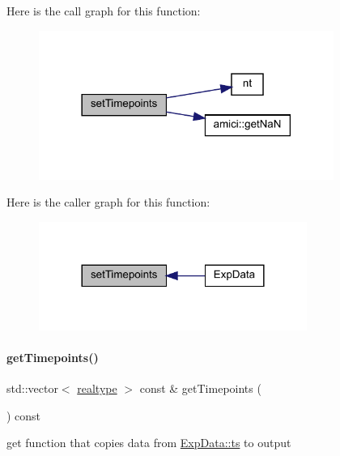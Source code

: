 Here is the call graph for this function\+:
\nopagebreak
\begin{figure}[H]
\begin{center}
\leavevmode
\includegraphics[width=273pt]{classamici_1_1_exp_data_a058fb6c96339b5116b1af937bc77c2e4_cgraph}
\end{center}
\end{figure}
Here is the caller graph for this function\+:
\nopagebreak
\begin{figure}[H]
\begin{center}
\leavevmode
\includegraphics[width=248pt]{classamici_1_1_exp_data_a058fb6c96339b5116b1af937bc77c2e4_icgraph}
\end{center}
\end{figure}
\mbox{\label{classamici_1_1_exp_data_a50ea5198d117f8f4ad1e34bb279975c8}} 
\paragraph{\texorpdfstring{get\+Timepoints()}{getTimepoints()}}
{\footnotesize\ttfamily std\+::vector$<$ \mbox{\hyperlink{namespaceamici_a1bdce28051d6a53868f7ccbf5f2c14a3}{realtype}} $>$ const  \& get\+Timepoints (\begin{DoxyParamCaption}{ }\end{DoxyParamCaption}) const}

get function that copies data from \mbox{\hyperlink{classamici_1_1_exp_data_aa7014a80e7b102f85a10e3b9a480e8e5}{Exp\+Data\+::ts}} to output

